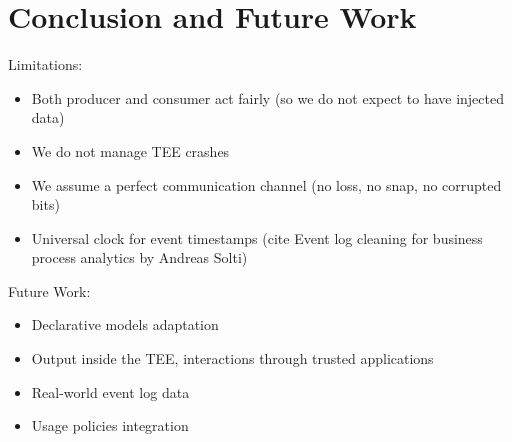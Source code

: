\section{Conclusion and Future Work}
Limitations:
\begin{itemize}
    \item Both producer and consumer act fairly (so we do not expect to have injected data)
    \item We do not manage TEE crashes
    \item We assume a perfect communication channel (no loss, no snap, no corrupted bits)
    \item Universal clock for event timestamps (cite Event log cleaning for business process analytics by Andreas Solti)
\end{itemize} 
Future Work:
\begin{itemize}
    \item Declarative models adaptation
    \item Output inside the TEE, interactions through trusted applications
    \item Real-world event log data
    \item Usage policies integration
\end{itemize}


